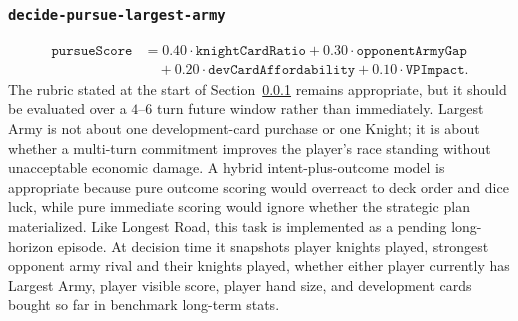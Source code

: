 \documentclass[letter,  12 pt]{article}
\begin{document}
\subsubsection{\texttt{decide-pursue-largest-army}}
\label{app:task-decide-pursue-largest-army}
\[
\begin{aligned}
\texttt{pursueScore}
&= 0.40 \cdot \texttt{knightCardRatio}
+ 0.30 \cdot \texttt{opponentArmyGap} \\
&\quad + 0.20 \cdot \texttt{devCardAffordability}
+ 0.10 \cdot \texttt{VPImpact}.
\end{aligned}
\]
The rubric stated at the start of Section~\ref{app:task-decide-pursue-largest-army} remains appropriate, but it should be evaluated over a $4$--$6$ turn future window rather than immediately. Largest Army is not about one development-card purchase or one Knight; it is about whether a multi-turn commitment improves the player's race standing without unacceptable economic damage. A hybrid intent-plus-outcome model is appropriate because pure outcome scoring would overreact to deck order and dice luck, while pure immediate scoring would ignore whether the strategic plan materialized.
Like Longest Road, this task is implemented as a pending long-horizon episode. At decision time it snapshots player knights played, strongest opponent army rival and their knights played, whether either player currently has Largest Army, player visible score, player hand size, and development cards bought so far in benchmark long-term stats.
\end{document}
